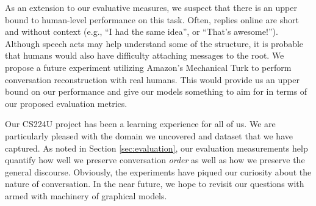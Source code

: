 \documentclass{article}
\begin{document}
As an extension to our evaluative measures, we suspect that there is an upper
bound to human-level performance on this task. Often, replies online are short
and without context (e.g., ``I had the same idea'', or ``That's awesome!'').
Although speech acts may help understand some of the structure, it is probable
that humans would also have difficulty attaching messages to the root. We
propose a future experiment utilizing Amazon's Mechanical Turk to perform
conversation reconstruction with real humans. This would provide us an upper
bound on our performance and give our models something to aim for in terms of
our proposed evaluation metrics.

Our CS224U project has been a learning experience for all of us. We are
particularly pleased with the domain we uncovered and dataset that we have
captured. As noted in Section \ref{sec:evaluation}, our evaluation measurements
help quantify how well we preserve conversation \textit{order} as well as how we
preserve the general discourse. Obviously, the experiments have piqued our curiosity 
about the nature of conversation. In the near future, we hope to revisit our 
questions with armed with machinery of graphical models.

{} 

\end{document}

